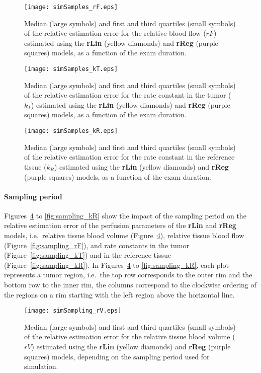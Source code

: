 \begin{figure}
\texttt{[image: simSamples\_rF.eps]}
\caption{Median (large symbols) and first and third quartiles (small symbols) of the relative estimation error for the relative blood flow ($rF$) estimated using the \textbf{rLin} (yellow diamonds) and \textbf{rReg} (purple squares) models, as a function of the exam duration.}
\label{fig:examDuration_rF}
\end{figure}

\begin{figure}
\texttt{[image: simSamples\_kT.eps]}
\caption{Median (large symbols) and first and third quartiles (small symbols) of the relative estimation error for the rate constant in the tumor ($k_T$) estimated using the \textbf{rLin} (yellow diamonds) and \textbf{rReg} (purple squares) models, as a function of the exam duration.}
\label{fig:examDuration_kT}
\end{figure}

\begin{figure}
\texttt{[image: simSamples\_kR.eps]}
\caption{Median (large symbols) and first and third quartiles (small symbols) of the relative estimation error for the rate constant in the reference tissue ($k_R$) estimated using the \textbf{rLin} (yellow diamonds) and \textbf{rReg} (purple squares) models, as a function of the exam duration.}
\label{fig:examDuration_kR}
\end{figure}


\paragraph{Sampling period}
Figures~\ref{fig:sampling_rV} to \ref{fig:sampling_kR} show the impact of the sampling period on the relative estimation error of the perfusion parameters of the \textbf{rLin} and \textbf{rReg} models, i.e.~relative tissue blood volume (Figure~\ref{fig:sampling_rV}), relative tissue blood flow (Figure~\ref{fig:sampling_rF}), and rate constants in the tumor (Figure~\ref{fig:sampling_kT}) and in the reference tissue (Figure~\ref{fig:sampling_kR}).
In Figures~\ref{fig:sampling_rV} to \ref{fig:sampling_kR}, each plot represents a tumor region, i.e.~the top row corresponds to the outer rim and the bottom row to the inner rim, the columns correspond to the clockwise ordering of the regions on a rim starting with the left region above the horizontal line.

\begin{figure}
\texttt{[image: simSampling\_rV.eps]}
\caption{Median (large symbols) and first and third quartiles (small symbols) of the relative estimation error for the relative tissue blood volume ($rV$) estimated using the \textbf{rLin} (yellow diamonds) and \textbf{rReg} (purple squares) models, depending on the sampling period used for simulation.}
\label{fig:sampling_rV}
\end{figure}

